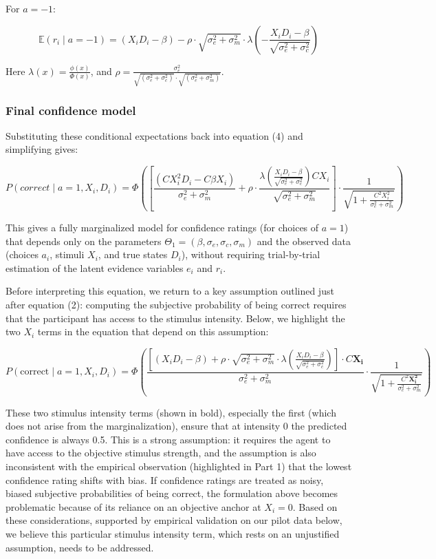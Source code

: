 \documentclass[
]{article}
\begin{document}
For \(a = -1\):

\[
\mathbb{E}(r_i \mid a = -1) = (X_iD_i - \beta) - \rho \cdot \sqrt{\sigma_e^2 + \sigma_m^2} \cdot \lambda\left(-\frac{X_iD_i - \beta}{\sqrt{\sigma_e^2 + \sigma_c^2}}\right)
\]

Here \(\lambda(x) = \frac{\phi(x)}{\Phi(x)}\), and
\(\rho = \frac{\sigma_e^2}{\sqrt{(\sigma_e^2 + \sigma_c^2)} \cdot \sqrt{(\sigma_e^2 + \sigma_m^2)}}\).

\subsubsection{Final confidence model}\label{final-confidence-model}

Substituting these conditional expectations back into equation (4) and
simplifying gives:

\[
P(correct \mid a = 1, X_i, D_i) = \Phi\left(\left[\frac{(CX_i^2D_i - C\beta X_i)}{\sigma_e^2 + \sigma_m^2} + \rho \cdot \frac{ \lambda\left(\frac{X_iD_i - \beta}{\sqrt{\sigma_e^2 + \sigma_c^2}}\right)CX_i}{\sqrt{\sigma_e^2 + \sigma_m^2} }\right] \cdot\frac{1} {\sqrt{1 + \frac{C^2X^2_i}{\sigma_e^2+\sigma_m^2}}}\right)
\]

This gives a fully marginalized model for confidence ratings (for
choices of \(a = 1\)) that depends only on the parameters
\(\Theta_1 = (\beta, \sigma_e, \sigma_c, \sigma_m)\) and the observed
data (choices \(a_i\), stimuli \(X_i\), and true states \(D_i\)),
without requiring trial-by-trial estimation of the latent evidence
variables \(e_i\) and \(r_i\).

Before interpreting this equation, we return to a key assumption
outlined just after equation (2): computing the subjective probability
of being correct requires that the participant has access to the
stimulus intensity. Below, we highlight the two \(X_i\) terms in the
equation that depend on this assumption:

\[
P(\text{correct} \mid a = 1, X_i, D_i) = \Phi\left(\frac{\left[(X_iD_i - \beta) + \rho \cdot \sqrt{\sigma_e^2 + \sigma_m^2} \cdot \lambda\left(\frac{X_iD_i - \beta}{\sqrt{\sigma_e^2 + \sigma_c^2}}\right)\right] \cdot C \mathbf{X_i}}{ \sigma_e^2 + \sigma_m^2} \cdot\frac{1} {\sqrt{1 + \frac{C^2\mathbf{X^2_i}}{\sigma_e^2+\sigma_m^2}}}\right) 
\]

These two stimulus intensity terms (shown in bold), especially the first
(which does not arise from the marginalization), ensure that at
intensity 0 the predicted confidence is always 0.5. This is a strong
assumption: it requires the agent to have access to the objective
stimulus strength, and the assumption is also inconsistent with the
empirical observation (highlighted in Part 1) that the lowest confidence
rating shifts with bias. If confidence ratings are treated as noisy,
biased subjective probabilities of being correct, the formulation above
becomes problematic because of its reliance on an objective anchor at
\(X_i = 0\). Based on these considerations, supported by empirical
validation on our pilot data below, we believe this particular stimulus
intensity term, which rests on an unjustified assumption, needs to be
addressed.
\end{document}
